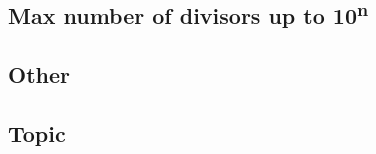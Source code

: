 \subsection{Max number of divisors up to 10\textsuperscript{n}}
\subsection{Other}
\subsection{Topic}



